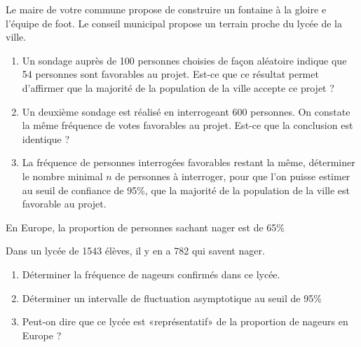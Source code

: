 \begin{question}[topic=probabilité,class=IG]
  Le maire de votre commune propose de construire un fontaine à la gloire e
  l'équipe de foot. Le conseil municipal propose un terrain proche du lycée
  de la ville.

  \begin{enumerate}
    \item Un sondage auprès de 100 personnes choisies de façon aléatoire
      indique que 54 personnes sont favorables au projet. Est-ce que ce
      résultat permet d'affirmer que la majorité de la population de la
      ville accepte ce projet ?
    \item Un deuxième sondage est réalisé en interrogeant 600 personnes. On
      constate la même fréquence de votes favorables au projet. Est-ce que
      la conclusion est identique ?
    \item La fréquence de personnes interrogées favorables restant la même,
      déterminer le nombre minimal $n$ de personnes à interroger, pour que
      l'on puisse estimer au seuil de confiance de 95\%, que la majorité de
      la population de la ville est favorable au projet.
  \end{enumerate}
\end{question}

\begin{question}[topic=probabilité,class=IG]
  En Europe, la proportion de personnes sachant nager est de 65\%

  Dans un lycée de 1543 élèves, il y en a 782 qui savent nager.

  \begin{enumerate}
    \item Déterminer la fréquence de nageurs confirmés dans ce lycée.
    \item Déterminer un intervalle de fluctuation asymptotique au seuil de
      95\%
    \item Peut-on dire que ce lycée est «représentatif» de la proportion de
      nageurs en Europe ?
  \end{enumerate}
\end{question}

